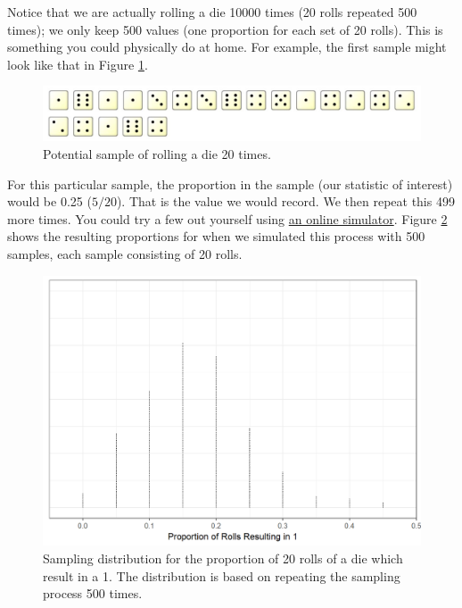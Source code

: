 \documentclass[]{book}
\theoremstyle{plain}
\theoremstyle{mydefn}
\theoremstyle{myexmpl}
\theoremstyle{remark}
\begin{document}
Notice that we are actually rolling a die 10000 times (20 rolls repeated
500 times); we only keep 500 values (one proportion for each set of 20
rolls). This is something you could physically do at home. For example,
the first sample might look like that in Figure
\ref{fig:samplingdistns-dice-example}.

\begin{figure}

{\centering \includegraphics[width=0.8\linewidth]{./images/SamplingDistns-Dice-Example} 

}

\caption{Potential sample of rolling a die 20 times.}\label{fig:samplingdistns-dice-example}
\end{figure}

For this particular sample, the proportion in the sample (our statistic
of interest) would be 0.25 (\(5/20\)). That is the value we would
record. We then repeat this 499 more times. You could try a few out
yourself using \href{https://www.random.org/dice/?num=20}{an online
simulator}. Figure \ref{fig:samplingdistns-dice-dotplot} shows the
resulting proportions for when we simulated this process with 500
samples, each sample consisting of 20 rolls.

\begin{figure}

{\centering \includegraphics[width=0.8\linewidth]{./Images/samplingdistns-dice-dotplot-1} 

}

\caption{Sampling distribution for the proportion of 20 rolls of a die which result in a 1.  The distribution is based on repeating the sampling process 500 times.}\label{fig:samplingdistns-dice-dotplot}
\end{figure}
\end{document}
